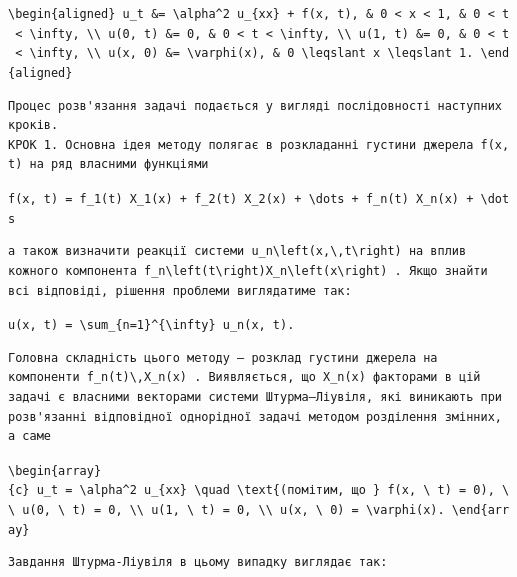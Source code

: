 \documentclass[
  ukrainian,
]{article}
\begin{document}
\texttt{\textbackslash{}begin\{aligned\}\ u\_t\ \&=\ \textbackslash{}alpha\^{}2\ u\_\{xx\}\ +\ f(x,\ t),\ \&\ 0\ \textless{}\ x\ \textless{}\ 1,\ \&\ 0\ \textless{}\ t\ \textless{}\ \textbackslash{}infty,\ \textbackslash{}\textbackslash{}\ u(0,\ t)\ \&=\ 0,\ \&\ 0\ \textless{}\ t\ \textless{}\ \textbackslash{}infty,\ \textbackslash{}\textbackslash{}\ u(1,\ t)\ \&=\ 0,\ \&\ 0\ \textless{}\ t\ \textless{}\ \textbackslash{}infty,\ \textbackslash{}\textbackslash{}\ u(x,\ 0)\ \&=\ \textbackslash{}varphi(x),\ \&\ 0\ \textbackslash{}leqslant\ x\ \textbackslash{}leqslant\ 1.\ \textbackslash{}end\{aligned\}}

\begin{verbatim}
Процес розв'язання задачі подається у вигляді послідовності наступних кроків.
КРОК 1. Основна ідея методу полягає в розкладанні густини джерела f(x, t) на ряд власними функціями
\end{verbatim}

\texttt{f(x,\ t)\ =\ f\_1(t)\ X\_1(x)\ +\ f\_2(t)\ X\_2(x)\ +\ \textbackslash{}dots\ +\ f\_n(t)\ X\_n(x)\ +\ \textbackslash{}dots}

\begin{verbatim}
а також визначити реакції системи u_n\left(x,\,t\right) на вплив кожного компонента f_n\left(t\right)X_n\left(x\right) . Якщо знайти всі відповіді, рішення проблеми виглядатиме так:
\end{verbatim}

\texttt{u(x,\ t)\ =\ \textbackslash{}sum\_\{n=1\}\^{}\{\textbackslash{}infty\}\ u\_n(x,\ t).}

\begin{verbatim}
Головна складність цього методу — розклад густини джерела на компоненти f_n(t)\,X_n(x) . Виявляється, що X_n(x) факторами в цій задачі є власними векторами системи Штурма–Ліувіля, які виникають при розв'язанні відповідної однорідної задачі методом розділення змінних, а саме
\end{verbatim}

\texttt{\textbackslash{}begin\{array\}\{c\}\ u\_t\ =\ \textbackslash{}alpha\^{}2\ u\_\{xx\}\ \textbackslash{}quad\ \textbackslash{}text\{(помітим,\ що\ \}\ f(x,\ \textbackslash{}\ t)\ =\ 0),\ \textbackslash{}\textbackslash{}\ u(0,\ \textbackslash{}\ t)\ =\ 0,\ \textbackslash{}\textbackslash{}\ u(1,\ \textbackslash{}\ t)\ =\ 0,\ \textbackslash{}\textbackslash{}\ u(x,\ \textbackslash{}\ 0)\ =\ \textbackslash{}varphi(x).\ \textbackslash{}end\{array\}}

\begin{verbatim}
Завдання Штурма-Ліувіля в цьому випадку виглядає так:
\end{verbatim}
\end{document}
